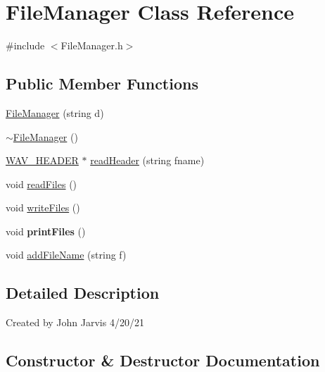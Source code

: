 \hypertarget{classFileManager}{}\section{File\+Manager Class Reference}
\label{classFileManager}


{\ttfamily \#include $<$File\+Manager.\+h$>$}

\subsection*{Public Member Functions}
\begin{DoxyCompactItemize}
\item 
\hyperlink{classFileManager_af7cd3220d7b6b4c78900e591568019b7}{File\+Manager} (string d)
\item 
\hyperlink{classFileManager_abaed33b5b0c13b8a597db9335a1aacfa}{$\sim$\+File\+Manager} ()
\item 
\hyperlink{structWAV__HEADER}{W\+A\+V\+\_\+\+H\+E\+A\+D\+ER} $\ast$ \hyperlink{classFileManager_a2db2e663db1df9cc19983f1bc642cf3a}{read\+Header} (string fname)
\item 
void \hyperlink{classFileManager_a2161783ca1618e76cf37dec25687ea5a}{read\+Files} ()
\item 
void \hyperlink{classFileManager_a8c9d83a8d5e00e0f33e9c7bc64ab7c15}{write\+Files} ()
\item 
\mbox{\label{classFileManager_aaf4a013cb2117f81cb2c2492b1f364b9}} 
void {\bfseries print\+Files} ()
\item 
void \hyperlink{classFileManager_acc1a9a9b7f5d6009fe953db4cc3b80bd}{add\+File\+Name} (string f)
\end{DoxyCompactItemize}


\subsection{Detailed Description}
Created by John Jarvis 4/20/21 

\subsection{Constructor \& Destructor Documentation}
\mbox{\label{classFileManager_af7cd3220d7b6b4c78900e591568019b7}} 

